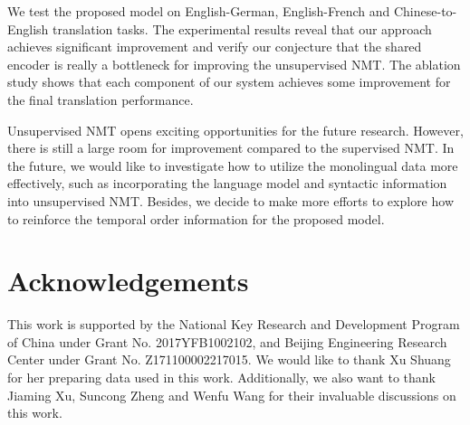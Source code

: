 \documentclass[11pt,a4paper]{article}
\begin{document}
We test the proposed model on English-German, English-French and Chinese-to-English translation tasks. The experimental results reveal that our approach achieves significant improvement and verify our conjecture that the shared encoder is really a bottleneck for improving the unsupervised NMT. The ablation study shows that each component of our system achieves some improvement for the final translation performance.

Unsupervised NMT opens exciting opportunities for the future research. However, there is still a large room for improvement compared to the supervised NMT. In the future, we would like to investigate how to utilize the monolingual data more effectively, such as incorporating the language model and syntactic information into unsupervised NMT. Besides, we decide to make more efforts to explore how to reinforce the temporal order information for the proposed model.

\section*{Acknowledgements}
This work is supported by the National Key Research and Development Program of China under Grant No. 2017YFB1002102, and Beijing Engineering Research Center under Grant No. Z171100002217015. We would like to thank Xu Shuang for her preparing data used in this work. Additionally, we also want to thank Jiaming Xu, Suncong Zheng and Wenfu Wang for their invaluable discussions on this work.




\appendix
\end{document}
